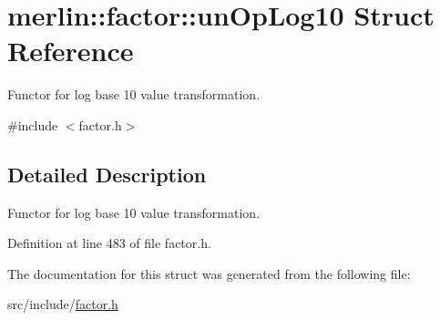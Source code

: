 \hypertarget{structmerlin_1_1factor_1_1unOpLog10}{}\section{merlin\+:\+:factor\+:\+:un\+Op\+Log10 Struct Reference}
\label{structmerlin_1_1factor_1_1unOpLog10}


Functor for log base 10 value transformation.  




{\ttfamily \#include $<$factor.\+h$>$}



\subsection{Detailed Description}
Functor for log base 10 value transformation. 

Definition at line 483 of file factor.\+h.



The documentation for this struct was generated from the following file\+:\begin{DoxyCompactItemize}
\item 
src/include/\hyperlink{factor_8h}{factor.\+h}\end{DoxyCompactItemize}
